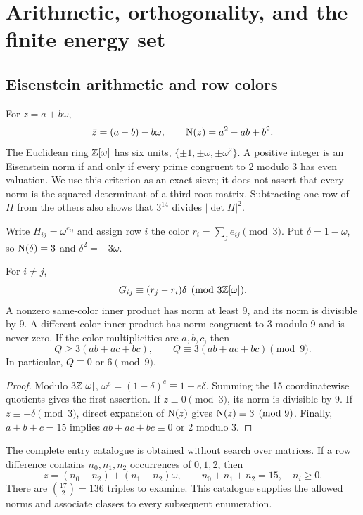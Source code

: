 \section{Arithmetic, orthogonality, and the finite energy set}
\subsection{Eisenstein arithmetic and row colors}
For $z=a+b\omega$,
\[
 \bar z=(a-b)-b\omega,\qquad \operatorname N(z)=a^2-ab+b^2.
\]
The Euclidean ring $\mathbb Z[\omega]$ has six units, $\{\pm1,\pm\omega,\pm\omega^2\}$. A positive integer is an Eisenstein norm if and only if every prime congruent to 2 modulo 3 has even valuation. We use this criterion as an exact sieve; it does not assert that every norm is the squared determinant of a third-root matrix. Subtracting one row of $H$ from the others also shows that $3^{14}$ divides $|\det H|^2$.

Write $H_{ij}=\omega^{e_{ij}}$ and assign row $i$ the color
$r_i=\sum_j e_{ij}\pmod3$. Put $\delta=1-\omega$, so $\operatorname N(\delta)=3$ and $\delta^2=-3\omega$.
\begin{lemma}\label{lem:colors}
For $i\ne j$,
\[
 G_{ij}\equiv(r_j-r_i)\delta\pmod{3\mathbb Z[\omega]}.
\]
A nonzero same-color inner product has norm at least 9, and its norm is divisible by 9. A different-color inner product has norm congruent to 3 modulo 9 and is never zero. If the color multiplicities are $a,b,c$, then
\begin{equation}\label{eq:color-energy}
 Q\ge3(ab+ac+bc),\qquad Q\equiv3(ab+ac+bc)\pmod9.
\end{equation}
In particular, $Q\equiv0$ or $6\pmod9$.
\end{lemma}
\begin{proof}
Modulo $3\mathbb Z[\omega]$, $\omega^e=(1-\delta)^e\equiv1-e\delta$. Summing the 15 coordinatewise quotients gives the first assertion. If $z\equiv0\pmod3$, its norm is divisible by 9. If $z\equiv\pm\delta\pmod3$, direct expansion of $\operatorname N(z)$ gives $\operatorname N(z)\equiv3\pmod9$. Finally, $a+b+c=15$ implies $ab+ac+bc\equiv0$ or 2 modulo 3.
\end{proof}

The complete entry catalogue is obtained without search over matrices. If a row difference contains $n_0,n_1,n_2$ occurrences of $0,1,2$, then
\begin{equation}\label{eq:entry-catalogue}
 z=(n_0-n_2)+(n_1-n_2)\omega,
 \qquad n_0+n_1+n_2=15,\quad n_i\ge0.
\end{equation}
There are $\binom{17}{2}=136$ triples to examine. This catalogue supplies the allowed norms and associate classes to every subsequent enumeration.

